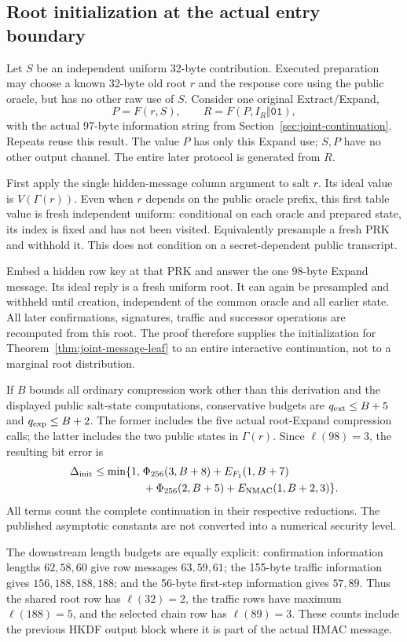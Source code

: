 \subsection{Root initialization at the actual entry boundary}
\label{app:joint-root-entry}

Let $S$ be an independent uniform 32-byte contribution. Executed
preparation may choose a known 32-byte old root $r$ and the response
core using the public oracle, but has no other raw use of $S$. Consider
one original Extract/Expand,
\[
 P=F(r,S),\qquad R=F(P,I_R\Vert\mathtt{01}),
\]
with the actual 97-byte information string from
Section~\ref{sec:joint-continuation}. Repeats reuse this result.
The value $P$ has only this Expand use; $S,P$ have no other output
channel. The entire later protocol is generated from $R$.

First apply the single hidden-message column argument to salt $r$.
Its ideal value is $V(\Gamma(r))$. Even when $r$ depends on the public
oracle prefix, this first table value is fresh independent uniform:
conditional on each oracle and prepared state, its index is fixed and
has not been visited. Equivalently presample a fresh PRK and withhold it.
This does not condition on a secret-dependent public transcript.

Embed a hidden row key at that PRK and answer the one 98-byte Expand
message. Its ideal reply is a fresh uniform root. It can again be
presampled and withheld until creation, independent of the common
oracle and all earlier state. All later confirmations, signatures,
traffic and successor operations are recomputed from this root.
The proof therefore supplies the initialization for
Theorem~\ref{thm:joint-message-leaf} to an entire interactive
continuation, not to a marginal root distribution.

If $B$ bounds all ordinary compression work other than this derivation
and the displayed public salt-state computations, conservative budgets
are $q_{\rm ext}\le B+5$ and $q_{\rm exp}\le B+2$.
The former includes the five actual root-Expand compression calls; the
latter includes the two public states in $\Gamma(r)$.
Since $\ell(98)=3$, the resulting bit error is
\begin{equation}
\begin{split}
 \Delta_{\rm init}\le\min\{1,\;&
 \Phi_{256}(3,B+8)+E_{F_1}(1,B+7)\\
 &+\Phi_{256}(2,B+5)+E_{\rm NMAC}(1,B+2,3)\}.
\end{split}
 \label{eq:appendix-root-initialization}
\end{equation}
All terms count the complete continuation in their respective reductions.
The published asymptotic constants are not converted into a numerical
security level.

The downstream length budgets are equally explicit: confirmation
information lengths $62,58,60$ give row messages $63,59,61$; the
155-byte traffic information gives $156,188,188,188$; and the
56-byte first-step information gives $57,89$. Thus the shared root row
has $\ell(32)=2$, the traffic rows have maximum $\ell(188)=5$, and the
selected chain row has $\ell(89)=3$. These counts include the previous
HKDF output block where it is part of the actual HMAC message.
